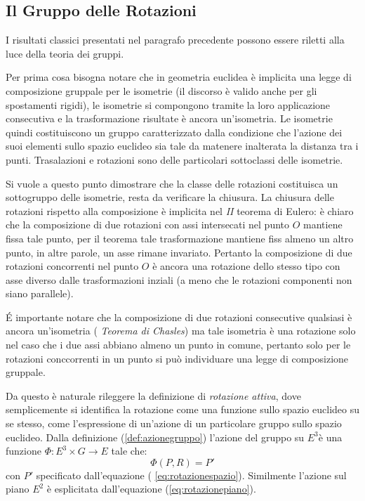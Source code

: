 \documentclass[11pt]{report}
\theoremstyle{plain}
\theoremstyle{definition}
\theoremstyle{remark}
\begin{document}
\subsection{Il Gruppo delle Rotazioni}
I risultati classici presentati nel paragrafo precedente possono essere riletti alla luce della teoria dei gruppi.

Per prima cosa bisogna notare che in geometria euclidea è implicita una legge di composizione gruppale per le isometrie (il discorso è valido anche per gli spostamenti rigidi), le isometrie si compongono tramite la loro applicazione consecutiva e la trasformazione risultate è ancora un'isometria. 
Le isometrie quindi costituiscono un gruppo caratterizzato dalla condizione che l'azione dei suoi elementi sullo spazio euclideo sia tale da matenere inalterata la distanza tra i punti. Trasalazioni e rotazioni sono delle particolari sottoclassi delle isometrie.

Si vuole a questo punto dimostrare che la classe delle rotazioni costituisca un sottogruppo delle isometrie, resta da verificare la chiusura. La chiusura delle rotazioni rispetto alla composizione è implicita nel \emph{II} teorema di Eulero: è chiaro che la composizione di due rotazioni con assi intersecati nel punto $O$ mantiene fissa tale punto, per il teorema tale trasformazione mantiene fiss almeno un altro punto, in altre parole, un asse rimane invariato.
Pertanto la composizione di due rotazioni concorrenti nel punto $O$ è ancora una rotazione dello stesso tipo con asse diverso dalle trasformazioni inziali (a meno che le rotazioni componenti non siano parallele).

É importante notare che la composizione di due rotazioni consecutive qualsiasi è ancora un'isometria ( \emph{Teorema di Chasles}) ma tale isometria è una rotazione solo nel caso che i due assi abbiano almeno un punto in comune, pertanto solo per le rotazioni conccorrenti in un punto si può individuare una legge di composizione gruppale.

Da questo è naturale rileggere la definizione di \emph{rotazione attiva}, dove semplicemente si identifica la rotazione come una funzione sullo spazio euclideo su se stesso, come l'espressione di un'azione di un particolare gruppo sullo spazio euclideo. 
Dalla definizione (\ref{def:azionegruppo}) l'azione del gruppo su $E^{3}$è una funzione $ \Phi : E^{3} \times G \rightarrow E $ tale che:
$$\Phi( P, R) = P' $$
con $P'$ specificato dall'equazione ( \ref{eq:rotazionespazio}).
Similmente l'azione sul piano $E^{2}$ è esplicitata dall'equazione (\ref{eq:rotazionepiano}).
\end{document}
